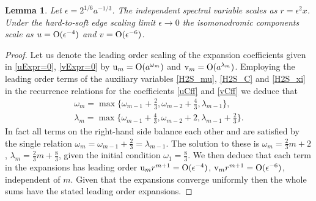 \documentclass[10pt,reqno]{amsart}
\theoremstyle{plain}
\newtheorem{lemma}{Lemma}
\theoremstyle{definition}
\theoremstyle{remark}
\begin{document}
\begin{lemma}
Let $ \epsilon = 2^{1/6}a^{-1/3} $. The independent spectral variable scales as $ r = \epsilon^2 x $.
Under the hard-to-soft edge scaling limit $ \epsilon \to 0 $ the isomonodromic components scale as 
$ u = {\rm O}(\epsilon^{-4}) $ and $ v = {\rm O}(\epsilon^{-6}) $.  
\end{lemma}
\begin{proof}
Let us denote the leading order scaling of the expansion coefficients given in \eqref{uExpr=0}, \eqref{vExpr=0} by
$ \text{u}_m = {\rm O}(a^{\omega_m}) $ and $ \text{v}_m = {\rm O}(a^{\lambda_m}) $. Employing the leading order
terms of the auxiliary variables \eqref{H2S_mu}, \eqref{H2S_C} and \eqref{H2S_xi} in the recurrence relations for the
coefficients \eqref{uCff} and \eqref{vCff} we deduce that
\begin{gather*}
   \omega_{m} = \max\{ \omega_{m-1}+\tfrac{2}{3}, \omega_{m-2}+\tfrac{4}{3}, \lambda_{m-1} \} ,
\\
   \lambda_{m} = \max\{ \omega_{m-1}+\tfrac{4}{3}, \omega_{m-2}+2, \lambda_{m-1}+\tfrac{2}{3} \} .
\end{gather*}
In fact all terms on the right-hand side balance each other and are satisfied by the single relation
$ \omega_{m} = \omega_{m-1}+\tfrac{2}{3} = \lambda_{m-1} $. The solution to these is 
$ \omega_m = \tfrac{2}{3}m+2 $, $ \lambda_m = \tfrac{2}{3}m+\tfrac{8}{3} $,
given the initial condition $ \omega_1 = \tfrac{8}{3} $. We then deduce that each term in the expansions has leading
order $ \text{u}_m r^{m+1} = {\rm O}(\epsilon^{-4}) $, $ \text{v}_m r^{m+1} = {\rm O}(\epsilon^{-6}) $,
independent of $ m $. Given that the expansions converge uniformly then the whole sums have the stated leading
order expansions.
\end{proof}
\end{document}
